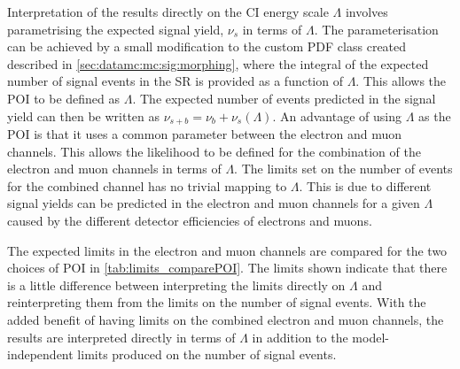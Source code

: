 Interpretation of the results directly on the CI energy scale $\Lambda$ involves parametrising the expected signal yield, $\nu_s$ in terms of $\Lambda$. The parameterisation can be achieved by a small modification to the custom PDF class created described in \cref{sec:datamc:mc:sig:morphing}, where the integral of the expected number of signal events in the SR is provided as a function of $\Lambda$. This allows the POI to be defined as $\Lambda$. The expected number of events predicted in the signal yield can then be written as $\nu_{s+b} = \nu_b +\nu_s(\Lambda)$. An advantage of using $\Lambda$ as the POI is that it uses a common parameter between the electron and muon channels. This allows the likelihood to be defined for the combination of the electron and muon channels in terms of $\Lambda$. The limits set on the number of events for the combined channel has no trivial mapping to $\Lambda$. This is due to different signal yields can be predicted in the electron and muon channels for a given $\Lambda$ caused by the different detector efficiencies of electrons and muons. 

The expected limits in the electron and muon channels are compared for the two choices of POI in \cref{tab:limits_comparePOI}. The limits shown indicate that there is a little difference between interpreting the limits directly on $\Lambda$ and reinterpreting them from the limits on the number of signal events. With the added benefit of having limits on the combined electron and muon channels, the results are interpreted directly in terms of $\Lambda$ in addition to the model-independent limits produced on the number of signal events. 

